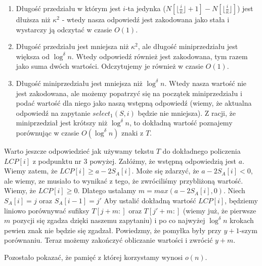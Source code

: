 \documentclass{article}
\begin{document}
\begin{enumerate}
    \item Długość przedziału w którym jest $i$-ta jedynka ($N[\lfloor \frac{i}{\kappa} \rfloor + 1] - N[\lfloor \frac{i}{\kappa} \rfloor]$) jest dłuższa niż $\kappa^2$ - wtedy nasza odpowiedź jest zakodowana jako stała i wystarczy ją odczytać w czasie $O(1)$.
    \item Długość przedziału jest mniejsza niż $\kappa^2$, ale długość miniprzedziału jest większa od $\log^{\delta}{n}$. Wtedy odpowiedź również jest zakodowana, tym razem jako suma dwóch wartości. Odczytujemy je również w czasie $O(1)$.
    \item Długość miniprzedziału jest mniejsza niż $\log^{\delta}{n}$. Wtedy nasza wartość nie jest zakodowana, ale możemy popatrzyć się na początek miniprzedziału i podać wartość dla niego jako naszą wstępną odpowiedź (wiemy, że aktualna odpowiedź na zapytanie $select_1(S, i)$ będzie nie mniejsza). Z racji, że miniprzedział jest krótszy niż $\log^{\delta}{n}$, to dokładną wartość poznajemy porównując w czasie $O(\log^{\delta}{n})$ znaki z $T$.
\end{enumerate}

Warto jeszcze odpowiedzieć jak używamy tekstu $T$ do dokładnego policzenia $LCP[i]$ z podpunktu nr 3 powyżej. Załóżmy, że wstępną odpowiedzią jest $a$. Wiemy zatem, że $LCP[i] \ge a - 2S_A[i]$. Może się zdarzyć, że $a - 2S_A[i] < 0$, ale wiemy, ze musiało to wynikać z tego, że zwróciliśmy przybliżoną wartość. Wiemy, że $LCP[i] \ge 0$. Dlatego ustalamy $m = max(a - 2S_A[i], 0)$. Niech $S_A[i] = j$ oraz $S_A[i - 1] = j'$ Aby ustalić dokładną wartość $LCP[i]$, będziemy liniowo porównywać sufiksy $T[j+m:]$ oraz $T[j'+m:]$ (wiemy już, że pierwsze $m$ pozycji się zgadza dzięki naszemu zapytaniu) i po co najwyżej $\log^{\delta}{n}$ krokach pewien znak nie będzie się zgadzał. Powiedzmy, że pomyłka były przy $y+1$-szym porównaniu. Teraz możemy zakończyć obliczanie wartości i zwrócić $y+m$.

Pozostało pokazać, że pamięć z której korzystamy wynosi $o(n)$.
\end{document}
